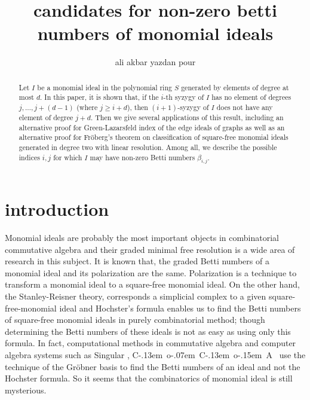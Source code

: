 \documentclass[a4paper,11pt]{amsart}
\theoremstyle{plain}
\theoremstyle{definition}
\theoremstyle{remark}
\begin{document}
\title{candidates for non-zero betti numbers of monomial ideals}
\author[a. a. yazdan pour]{{ali akbar} {yazdan pour}}
\address{department of mathematics\\ institute for advanced studies in basic sciences (IASBS)\\ p.o.box 45195-1159 \\ zanjan, iran}

\begin{abstract}
Let $I$ be a monomial ideal in the polynomial ring $S$ generated by elements of degree at most $d$. In this paper, it is shown that, if the $i$-th syzygy of $I$ has no element of degrees $j, \ldots, j+(d-1)$ (where $j \geq i+d$), then $(i+1)$-syzygy of $I$ does not have any element of degree $j+d$. Then we give several applications of this result, including an alternative proof for Green-Lazarsfeld index of the edge ideals of graphs as well as an alternative proof for Fr\"oberg's theorem on classification of square-free monomial ideals generated in degree two with linear resolution. Among all, we describe the possible indices $i, j$ for which $I$ may have non-zero Betti numbers $\beta_{i,j}$.
\end{abstract}
\maketitle

\section*{introduction}
Monomial ideals are probably the most important objects in combinatorial commutative algebra and their graded minimal free resolution is a wide area of research in this subject. It is known that, the graded Betti numbers of a monomial ideal and its polarization are the same. Polarization is a technique to transform a monomial ideal to a square-free monomial ideal. On the other hand, the Stanley-Reisner theory, corresponds a simplicial complex to a given square-free-monomial ideal and Hochster's formula \cite{Hochster} enables us to find the Betti numbers of square-free monomial ideals in purely combinatorial method; though determining the Betti numbers of these ideals is not as easy as using only this formula. In fact, computational methods in commutative algebra and computer algebra systems such as Singular \cite{Singular}, {{\hbox{\rm C\kern-.13em o\kern-.07em C\kern-.13em o\kern-.15em A}}}~\cite{CoCoA} use the technique of the Gr\"obner basis to find the Betti numbers of an ideal and not the Hochster formula. So it seems that the combinatorics of monomial ideal is still mysterious. 
\end{document}
